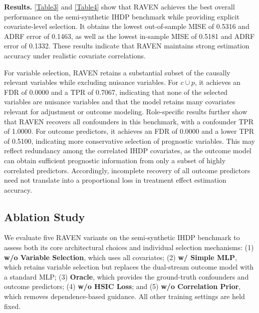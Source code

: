 \documentclass[twoside]{article}
\theoremstyle{plain}
\theoremstyle{definition}
\theoremstyle{remark}
\newtheorem{proof sketch}[theorem]{Proof Sketch}
\begin{document}
\textbf{Results.} 
\cref{Table3} and \cref{Table4} show that RAVEN achieves the best overall performance on the semi-synthetic IHDP benchmark while providing explicit covariate-level selection. 
It obtains the lowest out-of-sample MISE of 0.5316 and ADRF error of 0.1463, as well as the lowest in-sample MISE of 0.5181 and ADRF error of 0.1332.
These results indicate that RAVEN maintains strong estimation accuracy under realistic covariate correlations. 

For variable selection, RAVEN retains a substantial subset of the causally relevant variables while excluding nuisance variables. 
For $c \cup p$, it achieves an FDR of 0.0000 and a TPR of 0.7067, indicating that none of the selected variables are nuisance variables and that the model retains many covariates relevant for adjustment or outcome modeling. 
Role-specific results further show that RAVEN recovers all confounders in this benchmark, with a confounder TPR of 1.0000. 
For outcome predictors, it achieves an FDR of 0.0000 and a lower TPR of 0.5100, indicating more conservative selection of prognostic variables. 
This may reflect redundancy among the correlated IHDP covariates, as the outcome model can obtain sufficient prognostic information from only a subset of highly correlated predictors. 
Accordingly, incomplete recovery of all outcome predictors need not translate into a proportional loss in treatment effect estimation accuracy.



\subsection{Ablation Study}
\label{sec:ablation}
We evaluate five RAVEN variants on the semi-synthetic IHDP benchmark to assess both its core architectural choices and individual selection mechanisms:
(1) \textbf{w/o Variable Selection}, which uses all covariates;
(2) \textbf{w/ Simple MLP}, which retains variable selection but replaces the dual-stream outcome model with a standard MLP;
(3) \textbf{Oracle}, which provides the ground-truth confounders and outcome predictors;
(4) \textbf{w/o HSIC Loss}; and
(5) \textbf{w/o Correlation Prior}, which removes dependence-based guidance.
All other training settings are held fixed.
\end{document}
